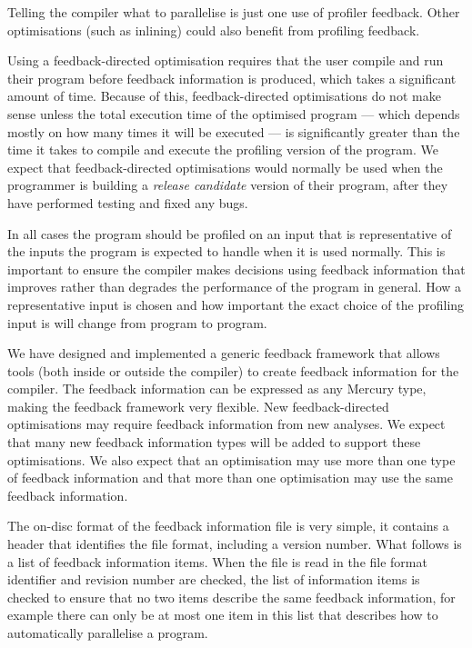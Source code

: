 
Telling the compiler what to parallelise is just one use of profiler feedback.
Other optimisations (such as inlining) could also benefit
from profiling feedback.

Using a feedback-directed optimisation requires that the user compile
and run their program before feedback information is produced, 
which takes a significant amount of time.
Because of this, feedback-directed optimisations do not make sense
unless
the total execution time of the optimised program --- which depends
mostly on how many times it will be executed --- is significantly
greater than the time it takes to compile and execute the profiling
version of the program.
We expect that feedback-directed optimisations would normally be used
when the programmer is building a \emph{release candidate} version of their
program, after they have performed testing and fixed any bugs.

In all cases the program should be profiled on an input that is
representative of the inputs the program is expected to handle when
it is used normally.
This is important to ensure the compiler makes decisions using
feedback information that improves rather than degrades the performance
of the program in general.
How a representative input is chosen and how important the exact choice
of the profiling input is will change from program to program.

We have designed and implemented a generic feedback framework that allows
tools (both inside or outside the compiler)
to create feedback information for the compiler.
The feedback information can be expressed as any Mercury type, making the
feedback framework very flexible.
New feedback-directed optimisations may require feedback information
from new analyses.
We expect that many new feedback information types will be added to
support these optimisations.
We also expect that an optimisation may use more than one type of
feedback information and that more than one optimisation may use the
same feedback information.

The on-disc format of the feedback information file is very simple, it
contains a header that identifies the file format, including a version number.
What follows is a list of feedback information items.
When the file is read in the file format identifier and revision
number are checked,
the list of information items is checked to ensure that no two items
describe the same feedback information, for example there can only be at
most one item in this list that describes how to automatically
parallelise a program.

